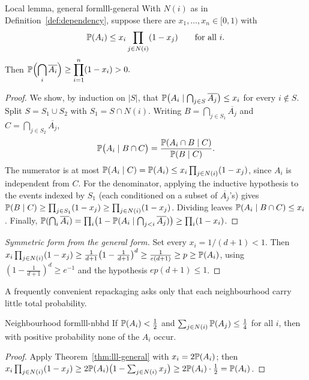 \begin{theorem}{Local lemma, general form}{lll-general}
With $N(i)$ as in Definition~\ref{def:dependency}, suppose there are
$x_1,\dots,x_n\in[0,1)$ with
\[
  \mathbb{P}(A_i)\le x_i\prod_{j\in N(i)}(1-x_j)\qquad\text{for all }i.
\]
Then $\displaystyle\mathbb{P}\Bigl(\bigcap_i\overline{A_i}\Bigr)
\ge\prod_{i=1}^n(1-x_i)>0.$
\end{theorem}

\begin{proof}
We show, by induction on $|S|$, that
$\mathbb{P}\bigl(A_i\mid\bigcap_{j\in S}\overline{A_j}\bigr)\le x_i$ for every
$i\notin S$. Split $S=S_1\cup S_2$ with $S_1=S\cap N(i)$. Writing
$B=\bigcap_{j\in S_1}\overline{A_j}$ and $C=\bigcap_{j\in S_2}\overline{A_j}$,
\[
  \mathbb{P}\bigl(A_i\mid B\cap C\bigr)
  =\frac{\mathbb{P}(A_i\cap B\mid C)}{\mathbb{P}(B\mid C)}.
\]
The numerator is at most $\mathbb{P}(A_i\mid C)=\mathbb{P}(A_i)\le
x_i\prod_{j\in N(i)}(1-x_j)$, since $A_i$ is independent from $C$. For the
denominator, applying the inductive hypothesis to the events indexed by $S_1$
(each conditioned on a subset of $\overline{A_j}$'s) gives
$\mathbb{P}(B\mid C)\ge\prod_{j\in S_1}(1-x_j)\ge\prod_{j\in N(i)}(1-x_j)$. Dividing
leaves $\mathbb{P}(A_i\mid B\cap C)\le x_i$. Finally,
$\mathbb{P}(\bigcap_i\overline{A_i})=\prod_{i}\bigl(1-\mathbb{P}(A_i\mid\bigcap_{j<i}
\overline{A_j})\bigr)\ge\prod_i(1-x_i)$.
\end{proof}

\begin{proof}[Symmetric form from the general form]
Set every $x_i=1/(d+1)<1$. Then
$x_i\prod_{j\in N(i)}(1-x_j)\ge\frac1{d+1}\bigl(1-\frac1{d+1}\bigr)^d
\ge\frac1{e(d+1)}\ge p\ge\mathbb{P}(A_i)$, using $(1-\frac1{d+1})^d\ge e^{-1}$ and
the hypothesis $ep(d+1)\le1$.
\end{proof}

A frequently convenient repackaging asks only that each neighbourhood carry
little total probability.

\begin{corollary}{Neighbourhood form}{lll-nbhd}
If $\mathbb{P}(A_i)<\tfrac12$ and $\sum_{j\in N(i)}\mathbb{P}(A_j)\le\tfrac14$ for all $i$,
then with positive probability none of the $A_i$ occur.
\end{corollary}

\begin{proof}
Apply Theorem~\ref{thm:lll-general} with $x_i=2\mathbb{P}(A_i)$; then
$x_i\prod_{j\in N(i)}(1-x_j)\ge2\mathbb{P}(A_i)\bigl(1-\sum_{j\in N(i)}x_j\bigr)
\ge2\mathbb{P}(A_i)\cdot\tfrac12=\mathbb{P}(A_i)$.
\end{proof}


